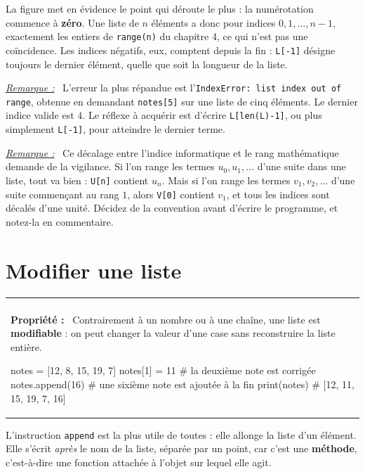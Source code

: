 \documentclass[a4paper,11pt,openany]{book}
\makeatletter
\newcommand{\mot}[1]{\textcolor{rougecours}{\textbf{#1}}}
\newcommand{\code}[1]{\texttt{\textcolor{codebleu}{#1}}}
\newenvironment{cadre}%
 {\par\vspace{2mm}\noindent\begin{tabular}{|@{\hspace{4mm}}p{0.93\textwidth}@{\hspace{4mm}}|}
  \hline \\[-2mm]}%
 {\\[2mm] \hline \end{tabular}\par\vspace{3mm}}
\newcommand{\propo}[1]{\textbf{Propriété #1 :}~}
\newenvironment{remarque}%
 {\par\vspace{1mm}\begin{list}{}{\leftmargin=1cm \rightmargin=0.5cm}\item[]%
  \textit{\underline{Remarque :}}~}%
 {\end{list}\vspace{1mm}}
\makeatother
\begin{document}
La figure met en évidence le point qui déroute le plus : la numérotation commence à \textbf{zéro}. Une liste de $n$ éléments a donc pour indices $0, 1, \dots, n-1$, exactement les entiers de \code{range(n)} du chapitre 4, ce qui n'est pas une coïncidence. Les indices négatifs, eux, comptent depuis la fin : \code{L[-1]} désigne toujours le dernier élément, quelle que soit la longueur de la liste.

\begin{remarque}
L'erreur la plus répandue est l'\code{IndexError: list index out of range}, obtenue en demandant \code{notes[5]} sur une liste de cinq éléments. Le dernier indice valide est $4$. Le réflexe à acquérir est d'écrire \code{L[len(L)-1]}, ou plus simplement \code{L[-1]}, pour atteindre le dernier terme.
\end{remarque}

\begin{remarque}
Ce décalage entre l'indice informatique et le rang mathématique demande de la vigilance. Si l'on range les termes $u_0, u_1, \dots$ d'une suite dans une liste, tout va bien : \code{U[n]} contient $u_n$. Mais si l'on range les termes $v_1, v_2, \dots$ d'une suite commençant au rang $1$, alors \code{V[0]} contient $v_1$, et tous les indices sont décalés d'une unité. Décidez de la convention avant d'écrire le programme, et notez-la en commentaire.
\end{remarque}

\section{Modifier une liste}

\begin{cadre}
\propo{} Contrairement à un nombre ou à une chaîne, une liste est \mot{modifiable} : on peut changer la valeur d'une case sans reconstruire la liste entière.
\begin{python}
notes = [12, 8, 15, 19, 7]
notes[1] = 11          # la deuxième note est corrigée
notes.append(16)       # une sixième note est ajoutée à la fin
print(notes)           # [12, 11, 15, 19, 7, 16]
\end{python}
\end{cadre}

L'instruction \code{append} est la plus utile de toutes : elle allonge la liste d'un élément. Elle s'écrit \emph{après} le nom de la liste, séparée par un point, car c'est une \mot{méthode}, c'est-à-dire une fonction attachée à l'objet sur lequel elle agit.
\end{document}
